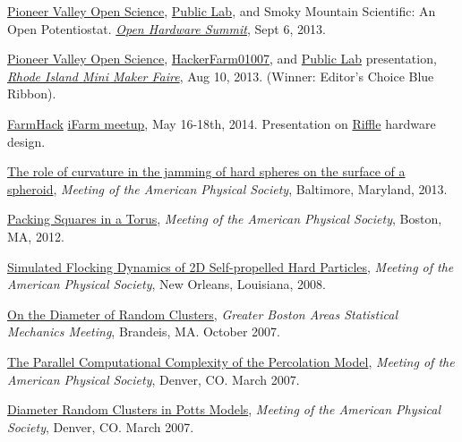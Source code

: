 \documentclass[10pt]{article}
\begin{document}
\begin{bibenum}

\item \href{http://pvos.org}{Pioneer Valley Open Science}, \href{http://publiclab.org}{Public Lab}, and Smoky Mountain Scientific: An Open Potentiostat. \href{http://2013.oshwa.org/}{\emph{Open Hardware Summit}}, Sept 6, 2013.  

\item \href{http://pvos.org}{Pioneer Valley Open Science}, \href{http://hackerfarm01007.org}{HackerFarm01007}, and \href{http://publiclab.org}{Public Lab} presentation, \href{http://makerfaireri.com/}{\emph{Rhode Island Mini Maker Faire}}, Aug 10, 2013.  (Winner: Editor's Choice Blue Ribbon). 

\item \href{http://farmhack.net}{FarmHack} \href{http://publiclab.org/notes/dorncox/05-10-2014/ifarm-2014}{iFarm meetup}, May 16-18th, 2014. Presentation on \href{http://publiclab.org/wiki/riffle}{Riffle} hardware design.

\item  \href{http://meetings.aps.org/Meeting/MAR13/Session/W29.11}{The role of curvature in the jamming of hard spheres on the surface of a spheroid}, \emph{Meeting of the American Physical Society}, Baltimore, Maryland, 2013.

\item \href{http://meetings.aps.org/Meeting/MAR12/Session/P53.8}{Packing Squares in a Torus}, \emph{Meeting of the American Physical Society}, Boston, MA, 2012.

\item \href{http://meetings.aps.org/Meeting/MAR08/Session/B39.11}{Simulated Flocking Dynamics of 2D Self-propelled Hard Particles}, \emph{Meeting of the American Physical Society}, New Orleans, Louisiana, 2008. 

\item \href{http://physics.clarku.edu/gbasm/fall2007/}{On the Diameter of Random Clusters}, \emph{Greater Boston Areas Statistical Mechanics Meeting}, Brandeis, MA. October 2007.

\item \href{http://meetings.aps.org/Meeting/MAR07/Event/57451}{The Parallel Computational Complexity of the Percolation Model}, \emph{Meeting of the American Physical Society}, Denver, CO. March 2007.

\item \href{http://meetings.aps.org/Meeting/MAR07/Session/H22.7}{Diameter Random Clusters in Potts Models}, \emph{Meeting of the American Physical Society}, Denver, CO. March 2007.


\end{bibenum}
\end{document}
